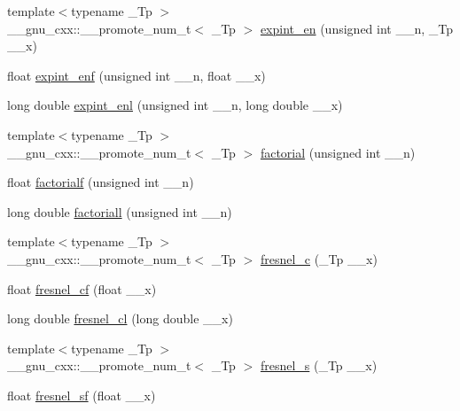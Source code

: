 \begin{DoxyCompactItemize}
\item 
{\footnotesize template$<$typename \+\_\+\+Tp $>$ }\\\+\_\+\+\_\+gnu\+\_\+cxx\+::\+\_\+\+\_\+promote\+\_\+num\+\_\+t$<$ \+\_\+\+Tp $>$ \hyperlink{namespace____gnu__cxx_a46e6f84b809d0128b6596f0040927089}{expint\+\_\+en} (unsigned int \+\_\+\+\_\+n, \+\_\+\+Tp \+\_\+\+\_\+x)
\item 
float \hyperlink{namespace____gnu__cxx_af62278eb2899eaffab68a79dadb15612}{expint\+\_\+enf} (unsigned int \+\_\+\+\_\+n, float \+\_\+\+\_\+x)
\item 
long double \hyperlink{namespace____gnu__cxx_aa3d0b9a177eb6666b6fbfa85d85650d0}{expint\+\_\+enl} (unsigned int \+\_\+\+\_\+n, long double \+\_\+\+\_\+x)
\item 
{\footnotesize template$<$typename \+\_\+\+Tp $>$ }\\\+\_\+\+\_\+gnu\+\_\+cxx\+::\+\_\+\+\_\+promote\+\_\+num\+\_\+t$<$ \+\_\+\+Tp $>$ \hyperlink{namespace____gnu__cxx_afdb75898f433c95eec50d8effbf94fb4}{factorial} (unsigned int \+\_\+\+\_\+n)
\item 
float \hyperlink{namespace____gnu__cxx_a5a288283a8ed63e1d2b0145f313a5378}{factorialf} (unsigned int \+\_\+\+\_\+n)
\item 
long double \hyperlink{namespace____gnu__cxx_a0904e504fdc3c8b9b6f5c66a73531584}{factoriall} (unsigned int \+\_\+\+\_\+n)
\item 
{\footnotesize template$<$typename \+\_\+\+Tp $>$ }\\\+\_\+\+\_\+gnu\+\_\+cxx\+::\+\_\+\+\_\+promote\+\_\+num\+\_\+t$<$ \+\_\+\+Tp $>$ \hyperlink{namespace____gnu__cxx_a7ecb0071ad3172d53276a967f9b702fc}{fresnel\+\_\+c} (\+\_\+\+Tp \+\_\+\+\_\+x)
\item 
float \hyperlink{namespace____gnu__cxx_a02ca7579d5aef96cba69e38e988e7a42}{fresnel\+\_\+cf} (float \+\_\+\+\_\+x)
\item 
long double \hyperlink{namespace____gnu__cxx_aa3f82a7569d61c2f7c194d2e64b616f8}{fresnel\+\_\+cl} (long double \+\_\+\+\_\+x)
\item 
{\footnotesize template$<$typename \+\_\+\+Tp $>$ }\\\+\_\+\+\_\+gnu\+\_\+cxx\+::\+\_\+\+\_\+promote\+\_\+num\+\_\+t$<$ \+\_\+\+Tp $>$ \hyperlink{namespace____gnu__cxx_aff40a89f169b1a8962ed0e75587c488b}{fresnel\+\_\+s} (\+\_\+\+Tp \+\_\+\+\_\+x)
\item 
float \hyperlink{namespace____gnu__cxx_a73450b8fd4abd5d8d3191dd6cbcda808}{fresnel\+\_\+sf} (float \+\_\+\+\_\+x)
\item 

\end{DoxyCompactItemize}
